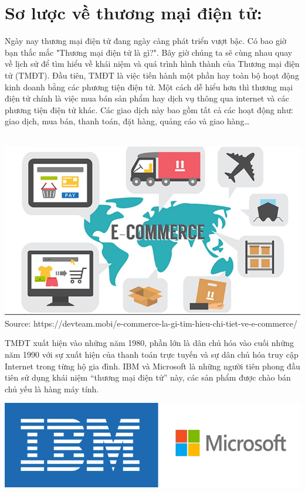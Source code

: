 \documentclass[13pt,a4paper]{article}
\begin{document}
\section{Sơ lược về thương mại điện tử:}
Ngày nay thương mại điện tử đang ngày càng phát triển vượt bậc. Có bao giờ bạn thắc mắc "Thương mại điện tử là gì?". Bây giờ chúng ta sẽ cùng nhau quay về lịch sử để tìm hiểu về khái niệm và quá trình hình thành của Thương mại điện tử (TMĐT). Đầu tiên, TMĐT là việc tiến hành một phần hay toàn bộ hoạt động kinh doanh bằng các phương tiện điện tử. Một cách dễ hiểu hơn thì thương mại điện tử chính là việc mua bán sản phẩm hay dịch vụ thông qua internet và các phương tiện điện tử khác. Các giao dịch này bao gồm tất cả các hoạt động như: giao dịch, mua bán, thanh toán, đặt hàng, quảng cáo và giao hàng… \\ \\
\begin{center}
\includegraphics[scale=0.5]{images/e-com.png}\\
\fontsize{10pt}{1.2pt}\selectfont
    Source: https://devteam.mobi/e-commerce-la-gi-tim-hieu-chi-tiet-ve-e-commerce/
\\
\end{center}
TMĐT xuất hiện vào những năm 1980, phần lớn là dân chủ hóa vào cuối những năm 1990 với sự xuất hiện của thanh toán trực tuyến và sự dân chủ hóa truy cập Internet trong từng hộ gia đình.
IBM và Microsoft là những người tiên phong đầu tiên sử dụng khái niệm “thương mại điện tử” này, các sản phẩm được chào bán chủ yếu là hàng máy tính.
\\\begin{center}
\includegraphics[scale=0.5]{images/IBM.png}\\
\end{center}
\end{document}
